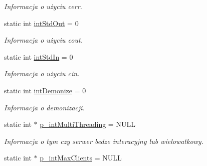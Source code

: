 \begin{DoxyCompactItemize}
\begin{DoxyCompactList}\small\item\em Informacja o użyciu cerr. \item\end{DoxyCompactList}\item 
\hypertarget{classServerConfigs_a1d80afb91cdd8cd80e58b4259bd28087}{
static int \hyperlink{classServerConfigs_a1d80afb91cdd8cd80e58b4259bd28087}{intStdOut} = 0}
\label{classServerConfigs_a1d80afb91cdd8cd80e58b4259bd28087}

\begin{DoxyCompactList}\small\item\em Informacja o użyciu cout. \item\end{DoxyCompactList}\item 
\hypertarget{classServerConfigs_aefa14f4b1ff6da3032d89d9e844c745e}{
static int \hyperlink{classServerConfigs_aefa14f4b1ff6da3032d89d9e844c745e}{intStdIn} = 0}
\label{classServerConfigs_aefa14f4b1ff6da3032d89d9e844c745e}

\begin{DoxyCompactList}\small\item\em Informacja o użyciu cin. \item\end{DoxyCompactList}\item 
\hypertarget{classServerConfigs_a4879aafc26d5e1838b7198eaf944ad81}{
static int \hyperlink{classServerConfigs_a4879aafc26d5e1838b7198eaf944ad81}{intDemonize} = 0}
\label{classServerConfigs_a4879aafc26d5e1838b7198eaf944ad81}

\begin{DoxyCompactList}\small\item\em Informacja o demonizacji. \item\end{DoxyCompactList}\item 
\hypertarget{classServerConfigs_a09e16704f3fc242e56568679c5bb9056}{
static int $\ast$ \hyperlink{classServerConfigs_a09e16704f3fc242e56568679c5bb9056}{p\_\-intMultiThreading} = NULL}
\label{classServerConfigs_a09e16704f3fc242e56568679c5bb9056}

\begin{DoxyCompactList}\small\item\em Informacja o tym czy serwer bedze interacyjny lub wielowatkowy. \item\end{DoxyCompactList}\item 
\hypertarget{classServerConfigs_ab99e0262c9839e2bccdb0cd12465f88e}{
static int $\ast$ \hyperlink{classServerConfigs_ab99e0262c9839e2bccdb0cd12465f88e}{p\_\-intMaxClients} = NULL}
\label{classServerConfigs_ab99e0262c9839e2bccdb0cd12465f88e}


\end{DoxyCompactItemize}
